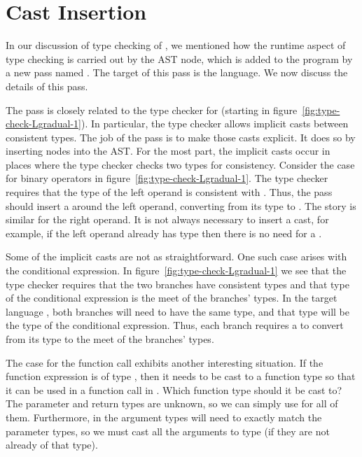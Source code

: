 \documentclass[7x10]{TimesAPriori_MIT}%
\numberwithin{theorem}{chapter}
\numberwithin{definition}{chapter}
\numberwithin{equation}{chapter}
\begin{document}
\section{Cast Insertion}
\label{sec:gradual-insert-casts}

In our discussion of type checking of \LangGrad{}, we mentioned how
the runtime aspect of type checking is carried out by the 
AST node, which is added to the program by a new pass named
. The target of this pass is the \LangCast{}
language.  We now discuss the details of this pass.

The  pass is closely related to the type checker
for \LangGrad{} (starting in figure~\ref{fig:type-check-Lgradual-1}).
In particular, the type checker allows implicit casts between
consistent types. The job of the  pass is to make
those casts explicit. It does so by inserting
 nodes into the AST.
%
For the most part, the implicit casts occur in places where the type
checker checks two types for consistency.  Consider the case for
binary operators in figure~\ref{fig:type-check-Lgradual-1}. The type
checker requires that the type of the left operand is consistent with
\INTTY{}. Thus, the  pass should insert a
 around the left operand, converting from its type to
\INTTY{}. The story is similar for the right operand. It is not always
necessary to insert a cast, for example, if the left operand already has type
\INTTY{} then there is no need for a .

Some of the implicit casts are not as straightforward. One such case
arises with the
conditional expression. In figure~\ref{fig:type-check-Lgradual-1} we
see that the type checker requires that the two branches have
consistent types and that type of the conditional expression is the
meet of the branches' types. In the target language \LangCast{}, both
branches will need to have the same type, and that type
will be the type of the conditional expression. Thus, each branch requires
a  to convert from its type to the meet of the branches' types.

The case for the function call exhibits another interesting situation. If
the function expression is of type \CANYTY{}, then it needs to be cast
to a function type so that it can be used in a function call in
\LangCast{}. Which function type should it be cast to? The parameter
and return types are unknown, so we can simply use \CANYTY{} for all
of them. Furthermore, in \LangCast{} the argument types will need to
exactly match the parameter types, so we must cast all the arguments
to type \CANYTY{} (if they are not already of that type).
\end{document}
